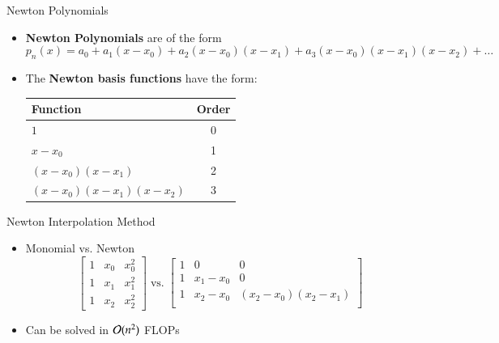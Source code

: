 \documentclass[10pt]{beamer}
\begin{document}
\begin{frame}{Newton Polynomials}
\begin{itemize}
\item \textbf{Newton Polynomials} are of the form
  \begin{equation*}
    p_n(x) = a_0 + a_1(x-x_0) + a_2(x-x_0)(x-x_1) + a_3(x-x_0)(x-x_1)(x-x_2) + \dots
  \end{equation*}

\item The \textbf{Newton basis functions} have the form:
\begin{center}
  \begin{tabular}{l | c}
  Function & Order \\
  \hline
  $1$ & 0\\
  $x-x_0$ & 1\\
  $(x-x_0)(x-x_1)$ & 2\\
  $(x-x_0)(x-x_1)(x-x_2)$ & 3\\
  \end{tabular}
\end{center}
\vspace{3mm}
\end{itemize}
\end{frame}
\begin{frame}{Newton Interpolation Method}

\begin{itemize}
    \item Monomial vs. Newton 
    $$
        \begin{bmatrix}
      1 & x_0 & x_0^2 \\
      1 & x_1 & x_1^2 \\
      1 & x_2 & x_2^2 
    \end{bmatrix}
    \;\text{vs.}\;
      \begin{bmatrix}
    1 & 0 & 0\\
    1 & x_1 - x_0 & 0\\
    1 & x_2 - x_0 & (x_2-x_0)(x_2-x_1)\\
  \end{bmatrix}
    $$
\item Can be solved in ${\mathcal{O}}(n^2)$ FLOPs 
\end{itemize}
\end{frame}
\end{document}
